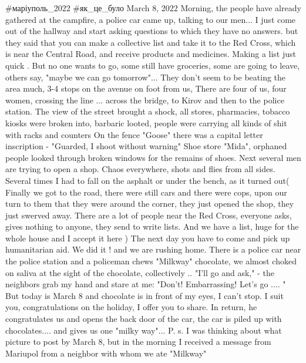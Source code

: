  
 
 
 
 

#маріуполь_2022 #як_це_було
March 8, 2022
Morning, the people have already gathered at the campfire, a police car came up, talking to our men... I just come out of the hallway and start asking questions to which they have no answers. but they said that you can make a collective list and take it to the Red Cross, which is near the Central Road, and receive products and medicines.
Making a list just quick . But no one wants to go, some still have groceries, some are going to leave, others say, "maybe we can go tomorrow"...
They don't seem to be beating the area much, 3-4 stops on the avenue on foot from us,
There are four of us, four women, crossing the line ... across the bridge, to Kirov and then to the police station.
The view of the street brought a shock, all stores, pharmacies, tobacco kiosks were broken into, barbaric looted, people were carrying all kinds of shit with racks and counters
On the fence "Goose" there was a capital letter inscription - "Guarded, I shoot without warning"
Shoe store "Mida", orphaned people looked through broken windows for the remains of shoes.
Next several men are trying to open a shop.
Chaos everywhere, shots and flies from all sides.
Several times I had to fall on the asphalt or under the bench, as it turned out(
Finally we got to the road, there were still cars and there were cops, upon our turn to them that they were around the corner, they just opened the shop, they just swerved away.
There are a lot of people near the Red Cross, everyone asks, gives nothing to anyone, they send to write lists.
And we have a list, huge for the whole house and I accept it here )
The next day you have to come and pick up humanitarian aid.
We did it ! and we are rushing home.
There is a police car near the police station and a policeman chews "Milkway" chocolate, we almost choked on saliva at the sight of the chocolate, collectively ..
"I'll go and ask," - the neighbors grab my hand and stare at me: "Don't! Embarrassing! Let's go .... "
But today is March 8 and chocolate is in front of my eyes, I can't stop.
I suit you, congratulations on the holiday, I offer you to share. In return, he congratulates us and opens the back door of the car, the car is piled up with chocolates.... and gives us one "milky way"...
P. s. I was thinking about what picture to post by March 8, but in the morning I received a message from Mariupol from a neighbor with whom we ate "Milkway" 🍫
